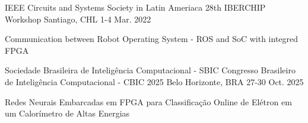 

\begin{cventries}

  \cventry
    {IEEE Circuits and Systems Society in Latin Ameriaca} %
    {28th IBERCHIP Workshop} %
    {Santiago, CHL} %
    {1-4 Mar. 2022} %
    {
      \begin{cvitems} %
        \item {Communication between Robot Operating System - ROS and SoC with integred FPGA}
      \end{cvitems}
    }
  
  \cventry
    {Sociedade Brasileira de Inteligência Computacional - SBIC} %
    {Congresso Brasileiro de Inteligência Computacional - CBIC 2025} %
    {Belo Horizonte, BRA} %
    {27-30 Oct. 2025} %
    {
      \begin{cvitems} %
        \item {Redes Neurais Embarcadas em FPGA para Classificação Online de Elétron em um Calorímetro de Altas Energias}
      \end{cvitems}
    }


\end{cventries}
